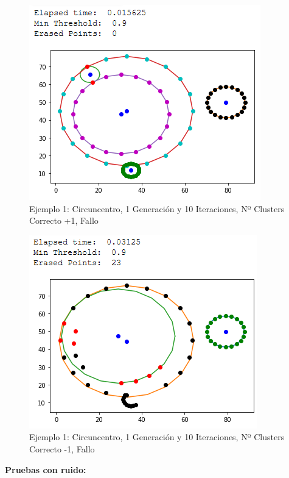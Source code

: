 \documentclass[conference,a4paper]{IEEEtran}
\begin{document}
\begin{figure}[H]
\centering
\includegraphics[scale=0.65]{Experimentacion/Ejemplo1/ej1_c_1_10_mc_wrong}
\caption{Ejemplo 1: Circuncentro, 1 Generación y 10 Iteraciones,  Nº Clusters Correcto +1, Fallo\\}
\end{figure}

\begin{figure}[H]
\centering
\includegraphics[scale=0.65]{Experimentacion/Ejemplo1/ej1_c_1_10_lc}
\caption{Ejemplo 1: Circuncentro, 1 Generación y 10 Iteraciones,  Nº Clusters Correcto -1, Fallo\\}
\end{figure}

\textbf{Pruebas con ruido:}\\
\end{document}
